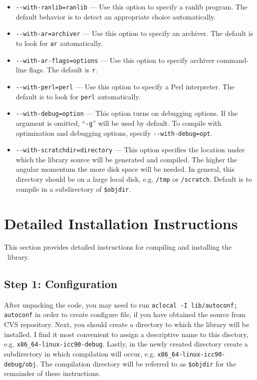 \documentclass[12pt]{article}
\begin{document}
\begin{itemize}
\item {\tt -}{\tt -with-ranlib=ranlib} --- Use this option to specify
  a ranlib program. The default behavior is to detect an appropriate
  choice automatically.
\item {\tt -}{\tt -with-ar=archiver} --- Use this option to specify an
  archiver.  The default is to look for {\tt ar} automatically.
\item {\tt -}{\tt -with-ar-flags=options} --- Use this option to specify
  archiver command-line flags. The default is {\tt r}.
\item {\tt -}{\tt -with-perl=perl} --- Use this option to specify a
  Perl interpreter.  The default is to look for {\tt perl} automatically.
\item {\tt -}{\tt -with-debug=option} --- This option turns on debugging
  options.  If the argument is omitted, ``{\tt -g}'' will be used by default.
  To compile with optimization and debugging options, specify {\tt -}{\tt -with-debug=opt}.
\item {\tt -}{\tt -with-scratchdir=directory} --- This option specifies the location
  under which the library source will be generated and compiled. The higher the angular
  momentum the more disk space will be needed. In general, this directory should be
  on a large local disk, e.g. {\tt /tmp} or {\tt /scratch}. Default is to compile
  in a subdirectory of {\tt \$objdir}.
\end{itemize}

\section{Detailed Installation Instructions}

This section provides detailed instructions for compiling and
installing the \LIBINT\ library.  

\subsection{Step 1: Configuration}

After unpacking the code, you may need to run {\tt aclocal -I lib/autoconf; autoconf}
in order to create configure file, if you have obtained the source from CVS repository.
Next, you should create a directory to which the library will be installed.
I find it most convenient to assign a descriptive name to this diectory, e.g.
{\tt x86\_64-linux-icc90-debug}. Lastly, in the newly created directory
create a subdirectory in which compilation will occur, e.g.
{\tt x86\_64-linux-icc90-debug/obj}. The compilation directory will be referred to as {\tt \$objdir}
for the remainder of these instructions.
\end{document}
